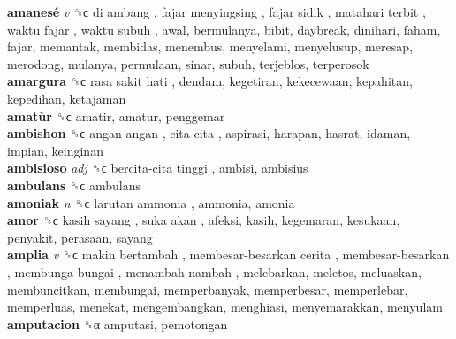 \textbf{amanesé} \emph{v}  ␝ϲ   di ambang ,  fajar menyingsing ,  fajar sidik ,  matahari terbit ,  waktu fajar ,  waktu subuh , awal, bermulanya, bibit, daybreak, dinihari, faham, fajar, memantak, membidas, menembus, menyelami, menyelusup, meresap, merodong, mulanya, permulaan, sinar, subuh, terjeblos, terperosok  \\
\textbf{amargura} ␝ϲ   rasa sakit hati , dendam, kegetiran, kekecewaan, kepahitan, kepedihan, ketajaman  \\
\textbf{amatùr} ␝ϲ  amatir, amatur, penggemar  \\
\textbf{ambishon} ␝ϲ   angan-angan ,  cita-cita , aspirasi, harapan, hasrat, idaman, impian, keinginan  \\
\textbf{ambisioso} \emph{adj}  ␝ϲ   bercita-cita tinggi , ambisi, ambisius  \\
\textbf{ambulans} ␝ϲ  ambulans  \\
\textbf{amoniak} \emph{n}  ␝ϲ   larutan ammonia , ammonia, amonia  \\
\textbf{amor} ␝ϲ   kasih sayang ,  suka akan , afeksi, kasih, kegemaran, kesukaan, penyakit, perasaan, sayang  \\
\textbf{amplia} \emph{v}  ␝ϲ   makin bertambah ,  membesar-besarkan cerita ,  membesar-besarkan ,  membunga-bungai ,  menambah-nambah , melebarkan, meletos, meluaskan, membuncitkan, membungai, memperbanyak, memperbesar, memperlebar, memperluas, menekat, mengembangkan, menghiasi, menyemarakkan, menyulam  \\
\textbf{amputacion} ␝α  amputasi, pemotongan  \\
